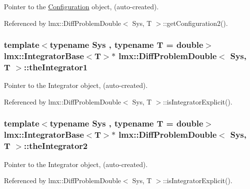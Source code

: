 Pointer to the \hyperlink{classlmx_1_1Configuration}{Configuration} object, (auto-\/created). 



Referenced by lmx\-::\-Diff\-Problem\-Double$<$ Sys, T $>$\-::get\-Configuration2().

\hypertarget{classlmx_1_1DiffProblemDouble_ab280b17787513f600649850f9a343aa6}{
\subsubsection[{the\-Integrator1}]{\setlength{\rightskip}{0pt plus 5cm}template$<$typename Sys , typename T  = double$>$ {\bf lmx\-::\-Integrator\-Base}$<$T$>$$\ast$ {\bf lmx\-::\-Diff\-Problem\-Double}$<$ Sys, T $>$\-::the\-Integrator1\hspace{0.3cm}{\ttfamily [protected]}}}\label{classlmx_1_1DiffProblemDouble_ab280b17787513f600649850f9a343aa6}


Pointer to the Integrator object, (auto-\/created). 



Referenced by lmx\-::\-Diff\-Problem\-Double$<$ Sys, T $>$\-::is\-Integrator\-Explicit().

\hypertarget{classlmx_1_1DiffProblemDouble_a64e25c04214254252b8750599f779b78}{
\subsubsection[{the\-Integrator2}]{\setlength{\rightskip}{0pt plus 5cm}template$<$typename Sys , typename T  = double$>$ {\bf lmx\-::\-Integrator\-Base}$<$T$>$$\ast$ {\bf lmx\-::\-Diff\-Problem\-Double}$<$ Sys, T $>$\-::the\-Integrator2\hspace{0.3cm}{\ttfamily [protected]}}}\label{classlmx_1_1DiffProblemDouble_a64e25c04214254252b8750599f779b78}


Pointer to the Integrator object, (auto-\/created). 



Referenced by lmx\-::\-Diff\-Problem\-Double$<$ Sys, T $>$\-::is\-Integrator\-Explicit().

